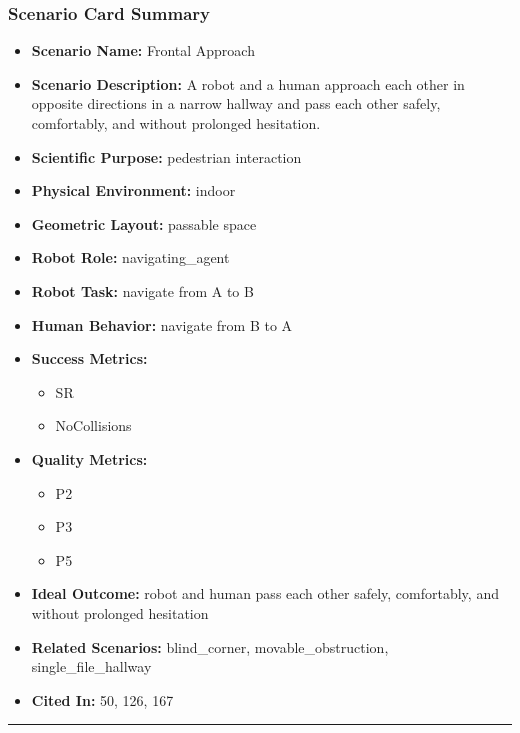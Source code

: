 \documentclass[utf8]{frontiers_suppmat} %
\providecommand{\tightlist}{%
  \setlength{\itemsep}{0pt}\setlength{\parskip}{0pt}}
\begin{document}
\subsubsection{Scenario Card Summary}\label{scenario-card-summary}

\begin{itemize}
\tightlist
\item
  \textbf{Scenario Name:} Frontal Approach
\item
  \textbf{Scenario Description:} A robot and a human approach each other
  in opposite directions in a narrow hallway and pass each other safely,
  comfortably, and without prolonged hesitation.
\item
  \textbf{Scientific Purpose:} pedestrian interaction
\item
  \textbf{Physical Environment:} indoor
\item
  \textbf{Geometric Layout:} passable space
\item
  \textbf{Robot Role:} navigating\_agent
\item
  \textbf{Robot Task:} navigate from A to B
\item
  \textbf{Human Behavior:} navigate from B to A
\item
  \textbf{Success Metrics:}

  \begin{itemize}
  \tightlist
  \item
    SR
  \item
    NoCollisions
  \end{itemize}
\item
  \textbf{Quality Metrics:}

  \begin{itemize}
  \tightlist
  \item
    P2
  \item
    P3
  \item
    P5
  \end{itemize}
\item
  \textbf{Ideal Outcome:} robot and human pass each other safely,
  comfortably, and without prolonged hesitation
\item
  \textbf{Related Scenarios:} blind\_corner, movable\_obstruction,
  single\_file\_hallway
\item
  \textbf{Cited In:} 50, 126, 167
\end{itemize}

\begin{center}\rule{0.5\linewidth}{0.5pt}\end{center}
\end{document}
